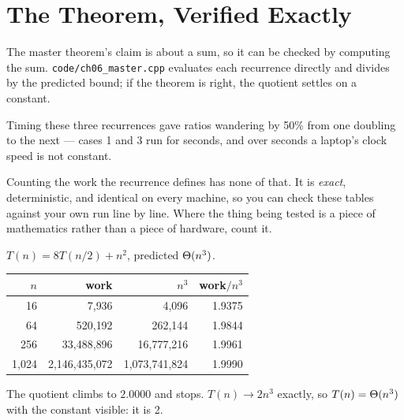 \section{The Theorem, Verified Exactly}

The master theorem's claim is about a sum, so it can be checked by computing
the sum. \texttt{code/ch06\_master.cpp} evaluates each recurrence directly and
divides by the predicted bound; if the theorem is right, the quotient settles
on a constant.

\begin{conceptbox}
Timing these three recurrences gave ratios wandering by 50\% from one doubling
to the next --- cases 1 and 3 run for seconds, and over seconds a laptop's
clock speed is not constant.

\smallskip
Counting the work the recurrence defines has none of that. It is \emph{exact},
deterministic, and identical on every machine, so you can check these tables
against your own run line by line. Where the thing being tested is a piece of
mathematics rather than a piece of hardware, count it.
\end{conceptbox}

\begin{worked}
$T(n) = 8T(n/2) + n^{2}$, predicted $\Theta(n^{3})$.

\begin{center}
\begin{tabular}{@{}rrrr@{}}
\toprule
\rowcolor{primary!15}
$n$ & work & $n^{3}$ & work$/n^{3}$ \\
\midrule
   16 &           7{,}936 &           4{,}096 & 1.9375 \\
   64 &         520{,}192 &         262{,}144 & 1.9844 \\
  256 &    33{,}488{,}896 &    16{,}777{,}216 & 1.9961 \\
1{,}024 & 2{,}146{,}435{,}072 & 1{,}073{,}741{,}824 & 1.9990 \\
\bottomrule
\end{tabular}
\end{center}

\smallskip
The quotient climbs to $2.0000$ and stops. $T(n) \to 2n^{3}$ exactly, so
$T(n) = \Theta(n^{3})$ with the constant visible: it is 2.
\end{worked}

